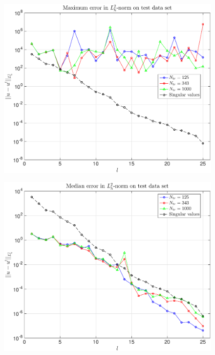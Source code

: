 \documentclass[11pt,a4paper]{article}
\theoremstyle{definition}
\theoremstyle{theorem}
\numberwithin{equation}{section}
\begin{document}
	\begin{figure}[H]
		\center
		\includegraphics[scale = 0.5]{fig15}
		\caption{}
	\end{figure}
	
	\begin{figure}[H]
		\center
		\includegraphics[scale = 0.5]{fig16}
		\caption{}
	\end{figure}
	
\end{document}
